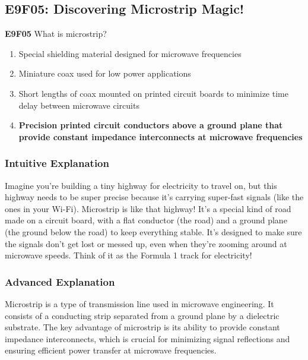 \subsection{E9F05: Discovering Microstrip Magic!}

\begin{tcolorbox}[colback=gray!10!white,colframe=black!75!black]
    \textbf{E9F05} What is microstrip?  
    \begin{enumerate}[label=\Alph*,noitemsep]
        \item Special shielding material designed for microwave frequencies
        \item Miniature coax used for low power applications
        \item Short lengths of coax mounted on printed circuit boards to minimize time delay between microwave circuits
        \item \textbf{Precision printed circuit conductors above a ground plane that provide constant impedance interconnects at microwave frequencies}
    \end{enumerate}
\end{tcolorbox}

\subsubsection{Intuitive Explanation}
Imagine you’re building a tiny highway for electricity to travel on, but this highway needs to be super precise because it’s carrying super-fast signals (like the ones in your Wi-Fi). Microstrip is like that highway! It’s a special kind of road made on a circuit board, with a flat conductor (the road) and a ground plane (the ground below the road) to keep everything stable. It’s designed to make sure the signals don’t get lost or messed up, even when they’re zooming around at microwave speeds. Think of it as the Formula 1 track for electricity!

\subsubsection{Advanced Explanation}
Microstrip is a type of transmission line used in microwave engineering. It consists of a conducting strip separated from a ground plane by a dielectric substrate. The key advantage of microstrip is its ability to provide constant impedance interconnects, which is crucial for minimizing signal reflections and ensuring efficient power transfer at microwave frequencies.

